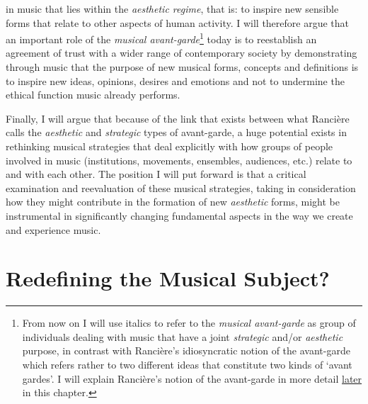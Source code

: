 in music that lies within the \emph{aesthetic regime}, that is: to inspire new sensible forms that relate to other aspects of human activity. I will therefore argue that an important role of the \emph{musical avant-garde}\footnote{From now on I will use italics to refer to the \emph{musical avant-garde} as group of individuals dealing with music that have a joint \emph{strategic} and/or \emph{aesthetic} purpose, in contrast with Ranci\`{e}re's idiosyncratic notion of the avant-garde which refers rather to two different ideas that constitute two kinds of `avant gardes'. I will explain Ranci\`{e}re's notion of the avant-garde in more detail \hyperlink{rethinkavant}{later} in this chapter.} today is to reestablish an agreement of trust with a wider range of contemporary society by demonstrating through music that the purpose of new musical forms, concepts and definitions is to inspire new ideas, opinions, desires and emotions and not to undermine the ethical function music already performs. 

Finally, I will argue that because of the link that exists between what Ranci\`{e}re calls the \emph{aesthetic} and \emph{strategic} types of avant-garde, a huge potential exists in rethinking musical strategies that deal explicitly with how groups of people involved in music (institutions, movements, ensembles, audiences, etc.) relate to and with each other.  The position I will put forward is that a critical examination and reevaluation of these musical strategies, taking in consideration how they might contribute in the formation of new \emph{aesthetic} forms, might be instrumental in significantly changing fundamental aspects in the way we create and experience music.

\hypertarget{eventdis}{}
\section{Redefining the Musical Subject?}

